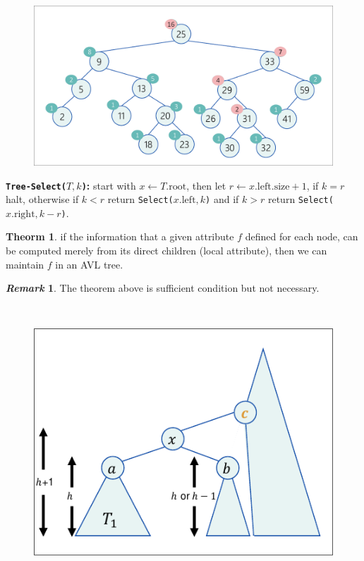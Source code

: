 \documentclass[]{article}
\theoremstyle{definition}
\newtheorem{Theorem}{\color{theoColor}Theorm}
\newtheorem{Remark}{\textit{Remark}}
\newcommand\theo  [1] {\begin{Theorem}#1\end{Theorem}}
\begin{document}
\begin{multicols}{4}
				\begin{figure}
					\includegraphics[width=\linewidth]{images/rankTreeExample}
				\end{figure}
				\textbf{\texttt{Tree-Select($T, k$)}: }start with $x \gets T.\mathrm{root}$, then let $r \gets x.\mathrm{left}.\mathrm{size} + 1$, if $k = r$ halt, otherwise if $k < r$ return \texttt{Select($x.\mathrm{left}, k$)} and if $k > r$ return \texttt{Select($x.\mathrm{right}, k - r$)}. 
				\theo{if the information that a given attribute $f$ defined for each node, can be computed merely from its direct children (\color{defiColor}local attribute\color{black}), then we can maintain $f$ in an AVL tree. }
				\begin{Remark}
					The theorem above is sufficient condition but not necessary. 
				\end{Remark}
				\,\!\vspace{-1em}
				\begin{figure}
					\includegraphics[width=\linewidth]{images/join2}
				\end{figure}
				

\end{multicols}
\end{document}
